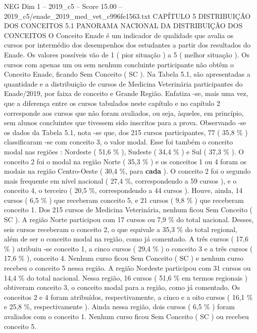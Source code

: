 \begin{textsample}{NEG Dim 1 – 2019\_c5 – Score 15.00 – 2019\_c5/enade\_2019\_med\_vet\_c996fe1563.txt}  \label{ex:f1_neg_394}
CAPÍTULO 5 DISTRIBUIÇÃO DOS CONCEITOS 5.1 PANORAMA NACIONAL DA DISTRIBUIÇÃO DOS CONCEITOS O Conceito Enade é um indicador de qualidade que avalia os cursos por intermédio dos desempenhos dos estudantes a partir dos resultados do Enade.
Os valores possíveis vão de 1 ( pior situação ) a 5 ( melhor situação ).
Os cursos com apenas um ou sem nenhum concluinte participante não obtêm o Conceito Enade, ficando Sem Conceito ( SC ).
Na Tabela 5.1, são apresentadas a quantidade e a distribuição de cursos de Medicina Veterinária participantes do Enade/2019, por faixa de conceito e Grande Região.
Enfatiza -se, mais uma vez, que a diferença entre os cursos tabulados neste capítulo e no capítulo 2 corresponde aos cursos que não foram avaliados, ou seja, àqueles, em princípio, sem alunos concluintes que tivessem sido inscritos para a prova.
Observando -se os dados da Tabela 5.1, nota -se que, dos 215 cursos participantes, 77 ( 35,8 \% ) classificaram -se com conceito 3, o valor modal.
Esse foi também o conceito modal nas regiões : Nordeste ( 51,6 \% ), Sudeste ( 34,4 \% ) e Sul ( 37,3 \% ).
O conceito 2 foi o modal na região Norte ( 35,3 \% ) e os conceitos 1 ou 4 foram os modais na região Centro-Oeste ( 30,4 \%, para \textbf{cada} ).
O conceito 2 foi o segundo mais frequente em nível nacional ( 27,4 \%, correspondendo a 59 cursos ), e o conceito 4, o terceiro ( 20,5 \%, correspondendo a 44 cursos ).
Houve, ainda, 14 cursos ( 6,5 \% ) que receberam conceito 5, e 21 cursos ( 9,8 \% ) que receberam conceito 1.
Dos 215 cursos de Medicina Veterinária, nenhum ficou Sem Conceito ( SC ).
A região Norte participou com 17 cursos ou 7,9 \% do total nacional.
Desses, seis cursos receberam o conceito 2, o que equivale a 35,3 \% do total regional, além de ser o conceito modal na região, como já comentado.
A três cursos ( 17,6 \% ) atribuiu -se conceito 1, a cinco cursos ( 29,4 \% ) o conceito 3 e a três cursos ( 17,6 \% ), conceito 4.
Nenhum curso ficou Sem Conceito ( SC ) e nenhum curso recebeu o conceito 5 nessa região.
A região Nordeste participou com 31 cursos ou 14,4 \% do total nacional.
Nessa região, 16 cursos ( 51,6 \% em termos regionais ) obtiveram conceito 3, o conceito modal para a região, como já comentado.
Os conceitos 2 e 4 foram atribuídos, respectivamente, a cinco e a oito cursos ( 16,1 \% e 25,8 \%, respectivamente ).
Ainda nessa região, dois cursos ( 6,5 \% ) foram avaliados com o conceito 1.
Nenhum curso ficou Sem Conceito ( SC ) ou recebeu conceito 5.

\end{textsample}
